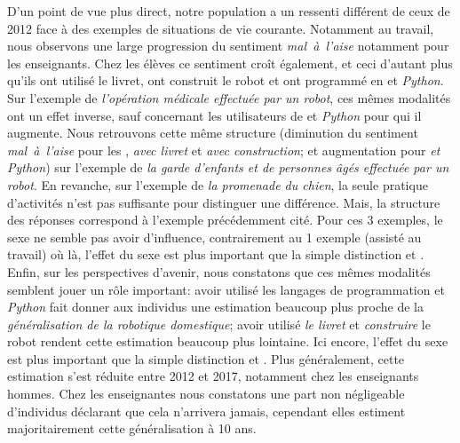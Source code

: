             D'un point de vue plus direct, notre population a un ressenti différent de ceux de 2012 face à des exemples de situations de vie courante. Notamment au travail, nous observons une large progression du sentiment \textit{mal~à~l'aise} notamment pour les enseignants. Chez les élèves  ce sentiment croît également, et ceci d'autant plus qu'ils ont utilisé le livret, ont construit le robot et ont programmé en  et \textit{Python}. 
            Sur l'exemple de \textit{l'opération médicale effectuée par un robot}, ces mêmes modalités ont un effet inverse, sauf concernant les utilisateurs de  et \textit{Python} pour qui il augmente. Nous retrouvons cette même structure (diminution du sentiment \textit{mal~à~l'aise} pour les , \textit{avec livret} et \textit{avec construction};  et augmentation pour \textit{ et Python}) sur l'exemple de \textit{la garde d'enfants et de personnes âgés effectuée par un robot}. 
            En revanche, sur l'exemple de \textit{la promenade du chien}, la seule pratique d'activités n'est pas suffisante pour distinguer une différence. Mais, la structure des réponses correspond à l'exemple précédemment cité.
            Pour ces 3 exemples, le sexe ne semble pas avoir d'influence, contrairement au 1\ier{} exemple (\ie assisté au travail) où là, l'effet du sexe est plus important que la simple distinction  et .
            Enfin, sur les perspectives d'avenir, nous constatons que ces mêmes modalités semblent jouer un rôle important: avoir utilisé les langages de programmation  et \textit{Python} fait donner aux individus une estimation beaucoup plus proche de la \textit{généralisation de la robotique domestique}; avoir utilisé \textit{le livret} et \textit{construire} le robot rendent cette estimation beaucoup plus lointaine. Ici encore, l'effet du sexe est plus important que la simple distinction  et . Plus généralement, cette estimation s'est réduite entre 2012 et 2017, notamment chez les enseignants hommes. Chez les enseignantes nous constatons une part non négligeable d'individus déclarant que cela n'arrivera jamais, cependant elles estiment majoritairement cette généralisation à 10 ans.
